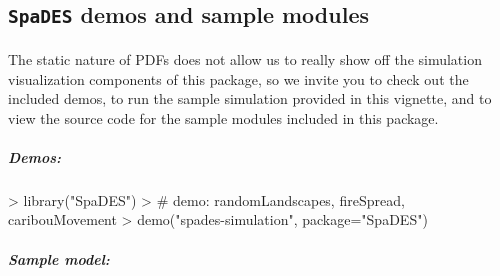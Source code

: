 \documentclass{article}
\begin{document}
\subsection{\texttt{SpaDES} demos and sample modules}

\paragraph{}
The static nature of PDFs does not allow us to really show off the simulation visualization components of this package, so we invite you to check out the included demos, to run the sample simulation provided in this vignette, and to view the source code for the sample modules included in this package.

\subparagraph{Demos:}

\begin{Schunk}
\begin{Sinput}
> library("SpaDES")
> # demo: randomLandscapes, fireSpread, caribouMovement
> demo("spades-simulation", package="SpaDES")
\end{Sinput}
\end{Schunk}

\subparagraph{Sample model:}
\end{document}

